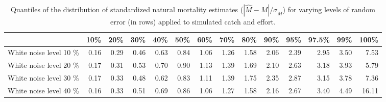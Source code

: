 \begin{sidewaystable}[ht]
\centering
\begin{tabular}{rrrrrrrrrrrrrr}
  \hline
 & 10\% & 20\% & 30\% & 40\% & 50\% & 60\% & 70\% & 80\% & 90\% & 95\% & 97.5\% & 99\% & 100\% \\ 
  \hline
White noise level  10 \% & 0.16 & 0.29 & 0.46 & 0.63 & 0.84 & 1.06 & 1.26 & 1.58 & 2.06 & 2.39 & 2.95 & 3.50 & 7.53 \\ 
  White noise level  20 \% & 0.17 & 0.31 & 0.53 & 0.70 & 0.90 & 1.13 & 1.39 & 1.69 & 2.10 & 2.63 & 3.18 & 3.93 & 5.79 \\ 
  White noise level  30 \% & 0.17 & 0.33 & 0.48 & 0.62 & 0.83 & 1.11 & 1.39 & 1.75 & 2.35 & 2.87 & 3.15 & 3.78 & 7.36 \\ 
  White noise level  40 \% & 0.16 & 0.33 & 0.51 & 0.69 & 0.86 & 1.06 & 1.27 & 1.58 & 2.16 & 2.67 & 3.40 & 4.49 & 16.11 \\ 
   \hline
\end{tabular}
\caption{Quantiles of the distribution of standardized natural mortality estimates ($|\hat{M} - M|/\sigma_{\hat{M}}$) for varying levels of random error (in rows) applied to simulated catch and effort.} 
\label{tab:SummaryOfDistributionOfNaturalMortality}
\end{sidewaystable}

